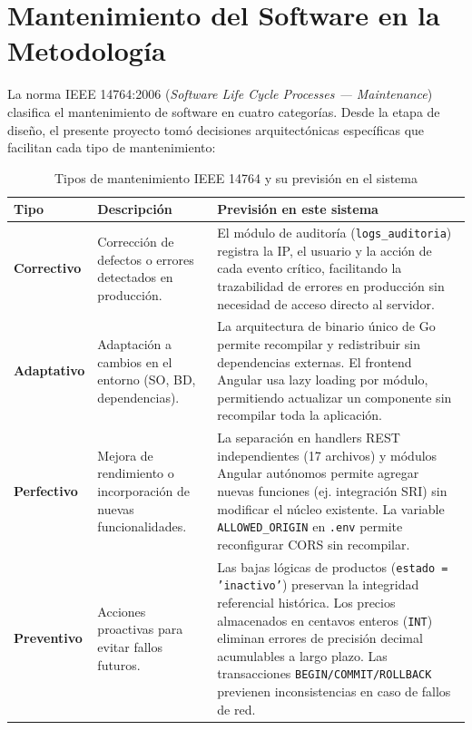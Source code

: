 \documentclass[12pt,a4paper,oneside]{report}
\begin{document}
\section{Mantenimiento del Software en la Metodología}

La norma IEEE 14764:2006 (\textit{Software Life Cycle Processes — Maintenance}) clasifica el mantenimiento de software en cuatro categorías. Desde la etapa de diseño, el presente proyecto tomó decisiones arquitectónicas específicas que facilitan cada tipo de mantenimiento:

\begin{table}[H]
\centering
\caption{Tipos de mantenimiento IEEE 14764 y su previsión en el sistema}
\begin{tabularx}{\textwidth}{|l|X|X|}
\hline
\rowcolor{lightgray}
\textbf{Tipo} & \textbf{Descripción} & \textbf{Previsión en este sistema} \\
\hline
\textbf{Correctivo} & Corrección de defectos o errores detectados en producción. & El módulo de auditoría (\texttt{logs\_auditoria}) registra la IP, el usuario y la acción de cada evento crítico, facilitando la trazabilidad de errores en producción sin necesidad de acceso directo al servidor. \\
\hline
\textbf{Adaptativo} & Adaptación a cambios en el entorno (SO, BD, dependencias). & La arquitectura de binario único de Go permite recompilar y redistribuir sin dependencias externas. El frontend Angular usa lazy loading por módulo, permitiendo actualizar un componente sin recompilar toda la aplicación. \\
\hline
\textbf{Perfectivo} & Mejora de rendimiento o incorporación de nuevas funcionalidades. & La separación en handlers REST independientes (17 archivos) y módulos Angular autónomos permite agregar nuevas funciones (ej. integración SRI) sin modificar el núcleo existente. La variable \texttt{ALLOWED\_ORIGIN} en \texttt{.env} permite reconfigurar CORS sin recompilar. \\
\hline
\textbf{Preventivo} & Acciones proactivas para evitar fallos futuros. & Las bajas lógicas de productos (\texttt{estado = 'inactivo'}) preservan la integridad referencial histórica. Los precios almacenados en centavos enteros (\texttt{INT}) eliminan errores de precisión decimal acumulables a largo plazo. Las transacciones \texttt{BEGIN/COMMIT/ROLLBACK} previenen inconsistencias en caso de fallos de red. \\
\hline
\end{tabularx}
\label{tab:mantenimiento-tipos}
\end{table}
\end{document}
